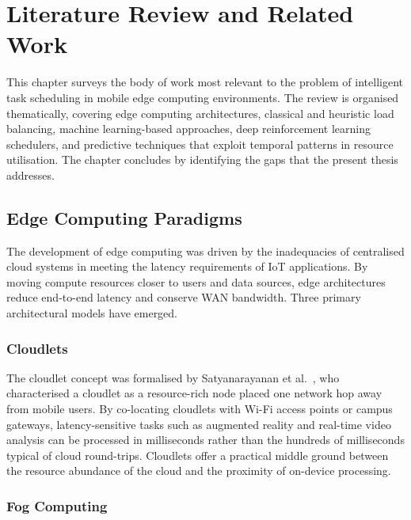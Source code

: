 \chapter{Literature Review and Related Work}
\label{chap:lit}

This chapter surveys the body of work most relevant to the problem
of intelligent task scheduling in mobile edge computing environments.
The review is organised thematically, covering edge computing
architectures, classical and heuristic load balancing, machine
learning-based approaches, deep reinforcement learning schedulers,
and predictive techniques that exploit temporal patterns in resource
utilisation. The chapter concludes by identifying the gaps that the
present thesis addresses.

\section{Edge Computing Paradigms}
\label{sec:lit_edge}

The development of edge computing was driven by the inadequacies of
centralised cloud systems in meeting the latency requirements of IoT
applications. By moving compute resources closer to users and data
sources, edge architectures reduce end-to-end latency and conserve
WAN bandwidth. Three primary architectural models have emerged.

\subsection{Cloudlets}

The cloudlet concept was formalised by Satyanarayanan
et al.~\cite{satyanarayanan2009case}, who characterised a cloudlet
as a resource-rich node placed one network hop away from mobile
users. By co-locating cloudlets with Wi-Fi access points or campus
gateways, latency-sensitive tasks such as augmented reality and
real-time video analysis can be processed in milliseconds rather
than the hundreds of milliseconds typical of cloud round-trips.
Cloudlets offer a practical middle ground between the resource
abundance of the cloud and the proximity of on-device processing.

\subsection{Fog Computing}

